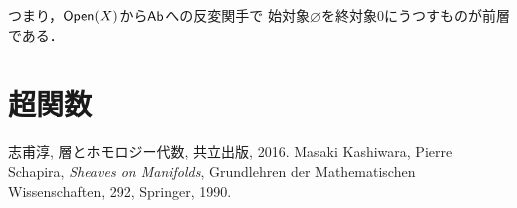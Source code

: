 つまり，$\mathop{\textsf{Open}}\nolimits(X)$から$\mathop{\textsf{Ab}}\nolimits$への反変関手で
始対象$\varnothing$を終対象$0$にうつすものが前層である．

\section{超関数}
\begin{thebibliography}{20} 
     志甫淳, 層とホモロジー代数, 共立出版, 2016.
     Masaki Kashiwara, Pierre Schapira, 
        \textit{Sheaves on Manifolds}, 
        Grundlehren der Mathematischen Wissenschaften, 292, Springer, 1990.

\end{thebibliography}




